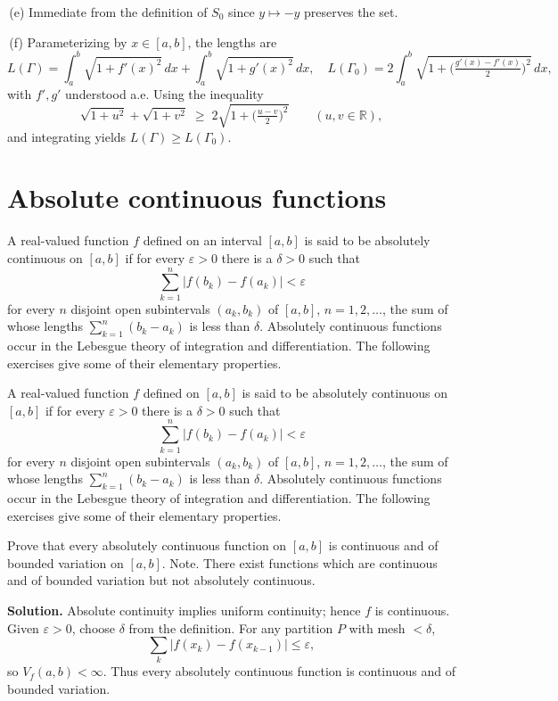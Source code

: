 \,(e) Immediate from the definition of $S_0$ since $y\mapsto -y$ preserves the set.

\,(f) Parameterizing by $x\in[a,b]$, the lengths are
\[L(\Gamma)=\int_a^b\!\sqrt{1+f'(x)^2}\,dx+\int_a^b\!\sqrt{1+g'(x)^2}\,dx,\quad L(\Gamma_0)=2\int_a^b\!\sqrt{1+\Big(\tfrac{g'(x)-f'(x)}{2}\Big)^{\!2}}\,dx,
\]
with $f',g'$ understood a.e. Using the inequality
\[\sqrt{1+u^2}+\sqrt{1+v^2}\;\ge\;2\sqrt{1+\Big(\tfrac{u-v}{2}\Big)^{\!2}}\qquad(u,v\in\mathbb{R}),\]
and integrating yields $L(\Gamma)\ge L(\Gamma_0)$.

\section{Absolute continuous functions}
A real-valued function $f$ defined on an interval $[a,b]$ is said to be absolutely continuous on $[a,b]$ if for every $\varepsilon > 0$ there is a $\delta > 0$ such that
\[\sum_{k=1}^{n} |f(b_k) - f(a_k)| < \varepsilon\]
for every $n$ disjoint open subintervals $(a_k, b_k)$ of $[a, b]$, $n = 1, 2, \ldots$, the sum of whose lengths $\sum_{k=1}^{n} (b_k - a_k)$ is less than $\delta$.
Absolutely continuous functions occur in the Lebesgue theory of integration and differentiation. The following exercises give some of their elementary properties.

\begin{problembox}
A real-valued function $f$ defined on $[a, b]$ is said to be absolutely continuous on $[a, b]$ if for every $\varepsilon > 0$ there is a $\delta > 0$ such that
\[\sum_{k=1}^{n} |f(b_k) - f(a_k)| < \varepsilon\]
for every $n$ disjoint open subintervals $(a_k, b_k)$ of $[a, b]$, $n = 1, 2, \ldots$, the sum of whose lengths $\sum_{k=1}^{n} (b_k - a_k)$ is less than $\delta$. Absolutely continuous functions occur in the Lebesgue theory of integration and differentiation. The following exercises give some of their elementary properties.

Prove that every absolutely continuous function on $[a, b]$ is continuous and of bounded variation on $[a, b]$. Note. There exist functions which are continuous and of bounded variation but not absolutely continuous.
\end{problembox}

\noindent\textbf{Solution.}
Absolute continuity implies uniform continuity; hence $f$ is continuous. Given $\varepsilon>0$, choose $\delta$ from the definition. For any partition $P$ with mesh $<\delta$,
\[\sum_k |f(x_k)-f(x_{k-1})|\le\varepsilon,\]
so $V_f(a,b)<\infty$. Thus every absolutely continuous function is continuous and of bounded variation.

